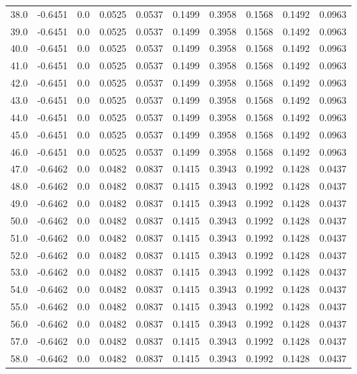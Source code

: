 \begin{longtable}{lrrrrrrrrr}
38.0 & -0.6451 & 0.0 & 0.0525 & 0.0537 & 0.1499 & 0.3958 & 0.1568 & 0.1492 & 0.0963 \\
39.0 & -0.6451 & 0.0 & 0.0525 & 0.0537 & 0.1499 & 0.3958 & 0.1568 & 0.1492 & 0.0963 \\
40.0 & -0.6451 & 0.0 & 0.0525 & 0.0537 & 0.1499 & 0.3958 & 0.1568 & 0.1492 & 0.0963 \\
41.0 & -0.6451 & 0.0 & 0.0525 & 0.0537 & 0.1499 & 0.3958 & 0.1568 & 0.1492 & 0.0963 \\
42.0 & -0.6451 & 0.0 & 0.0525 & 0.0537 & 0.1499 & 0.3958 & 0.1568 & 0.1492 & 0.0963 \\
43.0 & -0.6451 & 0.0 & 0.0525 & 0.0537 & 0.1499 & 0.3958 & 0.1568 & 0.1492 & 0.0963 \\
44.0 & -0.6451 & 0.0 & 0.0525 & 0.0537 & 0.1499 & 0.3958 & 0.1568 & 0.1492 & 0.0963 \\
45.0 & -0.6451 & 0.0 & 0.0525 & 0.0537 & 0.1499 & 0.3958 & 0.1568 & 0.1492 & 0.0963 \\
46.0 & -0.6451 & 0.0 & 0.0525 & 0.0537 & 0.1499 & 0.3958 & 0.1568 & 0.1492 & 0.0963 \\
47.0 & -0.6462 & 0.0 & 0.0482 & 0.0837 & 0.1415 & 0.3943 & 0.1992 & 0.1428 & 0.0437 \\
48.0 & -0.6462 & 0.0 & 0.0482 & 0.0837 & 0.1415 & 0.3943 & 0.1992 & 0.1428 & 0.0437 \\
49.0 & -0.6462 & 0.0 & 0.0482 & 0.0837 & 0.1415 & 0.3943 & 0.1992 & 0.1428 & 0.0437 \\
50.0 & -0.6462 & 0.0 & 0.0482 & 0.0837 & 0.1415 & 0.3943 & 0.1992 & 0.1428 & 0.0437 \\
51.0 & -0.6462 & 0.0 & 0.0482 & 0.0837 & 0.1415 & 0.3943 & 0.1992 & 0.1428 & 0.0437 \\
52.0 & -0.6462 & 0.0 & 0.0482 & 0.0837 & 0.1415 & 0.3943 & 0.1992 & 0.1428 & 0.0437 \\
53.0 & -0.6462 & 0.0 & 0.0482 & 0.0837 & 0.1415 & 0.3943 & 0.1992 & 0.1428 & 0.0437 \\
54.0 & -0.6462 & 0.0 & 0.0482 & 0.0837 & 0.1415 & 0.3943 & 0.1992 & 0.1428 & 0.0437 \\
55.0 & -0.6462 & 0.0 & 0.0482 & 0.0837 & 0.1415 & 0.3943 & 0.1992 & 0.1428 & 0.0437 \\
56.0 & -0.6462 & 0.0 & 0.0482 & 0.0837 & 0.1415 & 0.3943 & 0.1992 & 0.1428 & 0.0437 \\
57.0 & -0.6462 & 0.0 & 0.0482 & 0.0837 & 0.1415 & 0.3943 & 0.1992 & 0.1428 & 0.0437 \\
58.0 & -0.6462 & 0.0 & 0.0482 & 0.0837 & 0.1415 & 0.3943 & 0.1992 & 0.1428 & 0.0437 \\

\end{longtable}
